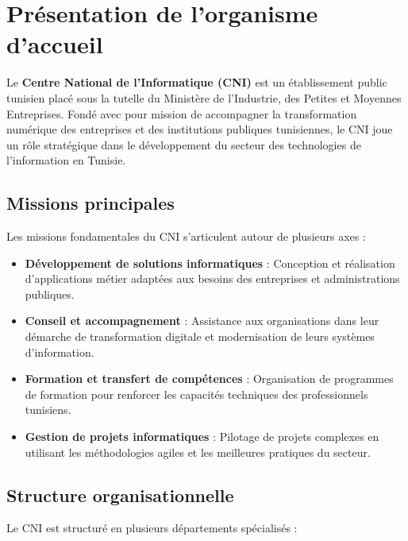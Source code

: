 \documentclass[12pt,a4paper]{report}
\begin{document}
\section{Présentation de l'organisme d'accueil}

Le \textbf{Centre National de l'Informatique (CNI)} est un établissement public tunisien placé sous la tutelle du Ministère de l'Industrie, des Petites et Moyennes Entreprises. Fondé avec pour mission de accompagner la transformation numérique des entreprises et des institutions publiques tunisiennes, le CNI joue un rôle stratégique dans le développement du secteur des technologies de l'information en Tunisie.

\subsection{Missions principales}

Les missions fondamentales du CNI s'articulent autour de plusieurs axes :

\begin{itemize}[leftmargin=1cm]
    \item \textbf{Développement de solutions informatiques} : Conception et réalisation d'applications métier adaptées aux besoins des entreprises et administrations publiques.
    
    \item \textbf{Conseil et accompagnement} : Assistance aux organisations dans leur démarche de transformation digitale et modernisation de leurs systèmes d'information.
    
    \item \textbf{Formation et transfert de compétences} : Organisation de programmes de formation pour renforcer les capacités techniques des professionnels tunisiens.
    
    \item \textbf{Gestion de projets informatiques} : Pilotage de projets complexes en utilisant les méthodologies agiles et les meilleures pratiques du secteur.
\end{itemize}

\subsection{Structure organisationnelle}

Le CNI est structuré en plusieurs départements spécialisés :
\end{document}
